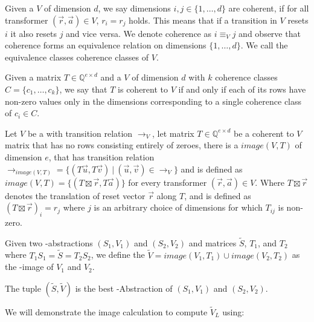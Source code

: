 \begin{mydef}
	Given a \qvasr $V$ of dimension $d$, we say dimensions $i, j \in \{1, \ldots, d\}$ are coherent, if for all transformer $(\vec{r}, \vec{a}) \in V$, $r_i = r_j$ holds. This means that if a transition in $V$ resets $i$ it also resets $j$ and vice versa. We denote coherence as $i \equiv_V j$ and observe that coherence forms an equivalence relation on dimensions $\{1, \ldots, d\}$. We call the equivalence classes coherence classes of $V$.
\end{mydef}
Given a matrix $T \in \mathbb{Q}^{e \times d}$ and a \qvasr $V$ of dimension $d$ with $k$ coherence classes $C = \{c_1, \ldots, c_k\}$, we say that $T$ is coherent to $V$ if and only if each of its rows have non-zero values only in the dimensions corresponding to a single coherence class of $c_i \in C$. \\ \par
Let $V$ be a \qvasr with transition relation $\rightarrow_V$, let matrix  $T \in \mathbb{Q}^{e \times d}$ be a coherent to $V$ matrix that has no rows consisting entirely of zeroes, there is a \qvasr $image(V, T)$ of dimension $e$, that has transition relation $\rightarrow_{image(V, T)} = \{(T\vec{u}, T\vec{v})\ |\ (\vec{u}, \vec{v}) \in\rightarrow_V \}$ and is defined as $image(V, T) = \{(T\boxtimes\vec{r}, T\vec{a})\}$ for every transformer $(\vec{r}, \vec{a}) \in V$. Where $T\boxtimes\vec{r}$ denotes the translation of reset vector $\vec{r}$ along $T$, and is defined as $(T\boxtimes\vec{r})_i = r_j$ where $j$ is an arbitrary choice of dimensions for which $T_{ij}$ is non-zero. \\ \par
\begin{mydef}
Given two \qvasr-abstractions $(S_1, V_1)$ and $(S_2, V_2)$ and matrices $\tilde{S}$, $T_1$, and $T_2$ where $T_1S_1 = \tilde{S} = T_2S_2$, we define the \qvasr $\tilde{V} = image(V_1, T_1) \cup image(V_2, T_2)$ as the \qvasr-image of $V_1$ and $V_2$.
\end{mydef}
The tuple $(\tilde{S}, \tilde{V})$ is the best \qvasr-Abstraction of $(S_1, V_1)$ and $(S_2, V_2)$. \\ \par
We will demonstrate the image calculation to compute \qvasr $\tilde{V}_L$ using:
